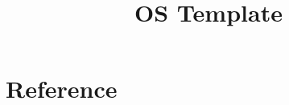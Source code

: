 \documentclass[10pt]{article}
\title{OS Template}
\author{}
\begin{document}
\maketitle
\begin{abstract}
\end{abstract}
\renewcommand{\setminus}{\mathbin{\backslash}}

\section*{Reference}
\printbibliography
\end{document}
